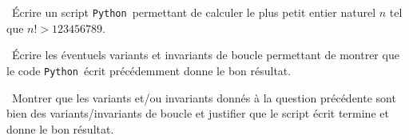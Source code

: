 \exer{}
\setcounter{numques}{0}

\question\ Écrire un script \texttt{Python}\ permettant de calculer le plus petit entier naturel $n$ tel que $n!>123456789$.

\question\ Écrire les éventuels variants et invariants de boucle permettant de montrer que le code \texttt{Python}\ écrit précédemment donne le bon résultat.

\question\ Montrer que les variants et/ou invariants donnés à la question précédente sont bien des variants/invariants  
de boucle et justifier que le script écrit termine et donne le bon résultat. 

